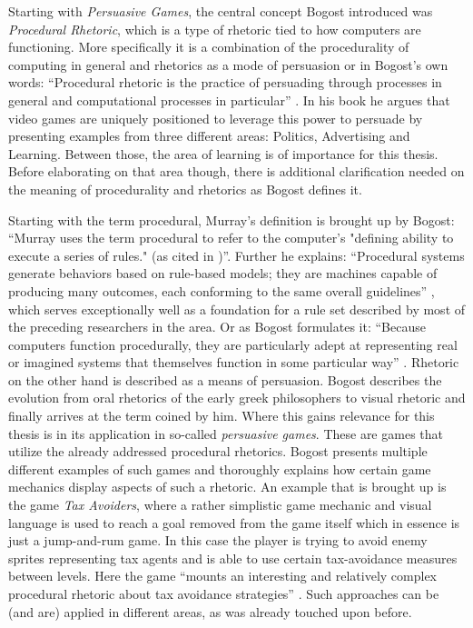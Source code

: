 Starting with \textit{Persuasive Games}, the central concept Bogost introduced was \textit{Procedural Rhetoric}, which is a type of rhetoric tied to how computers are functioning. More specifically it is a combination of the procedurality of computing in general and rhetorics as a mode of persuasion or in Bogost's own words: \enquote{Procedural rhetoric is the practice of persuading through processes in general and computational processes in particular} \cite[p. 3]{bogost2007persuasive}. In his book he argues that video games are uniquely positioned to leverage this power to persuade by presenting examples from three different areas: Politics, Advertising and Learning. Between those, the area of learning is of importance for this thesis. Before elaborating on that area though, there is additional clarification needed on the meaning of procedurality and rhetorics as Bogost defines it.

Starting with the term procedural, Murray's definition is brought up by Bogost: \enquote{Murray uses the term procedural to refer to the computer’s "defining ability to execute a series of rules." (as cited in \cite[p. 4]{bogost2007persuasive})}. Further he explains: \enquote{Procedural systems generate behaviors based on rule-based models; they are machines capable of producing many outcomes, each conforming to the same overall guidelines} \cite[p. 4]{bogost2007persuasive}, which serves exceptionally well as a foundation for a rule set described by most of the preceding researchers in the area. Or as Bogost formulates it: \enquote{Because computers function procedurally, they are particularly adept at representing real or imagined systems that themselves function in some particular way} \cite[p. 5]{bogost2007persuasive}. Rhetoric on the other hand is described as a means of persuasion. Bogost describes the evolution from oral rhetorics of the early greek philosophers to visual rhetoric and finally arrives at the term coined by him. Where this gains relevance for this thesis is in its application in so-called \textit{persuasive games}. These are games that utilize the already addressed procedural rhetorics. Bogost presents multiple different examples of such games \cite[p. 46-53]{bogost2007persuasive} and thoroughly explains how certain game mechanics display aspects of such a rhetoric. An example that is brought up is the game \textit{Tax Avoiders}, where a rather simplistic game mechanic and visual language is used to reach a goal removed from the game itself which in essence is just a jump-and-rum game. In this case the player is trying to avoid enemy sprites representing tax agents and is able to use certain tax-avoidance measures between levels. Here the game \enquote{mounts an interesting and relatively complex procedural rhetoric about tax avoidance strategies} \cite[p. 52]{bogost2007persuasive}. Such approaches can be (and are) applied in different areas, as was already touched upon before.

